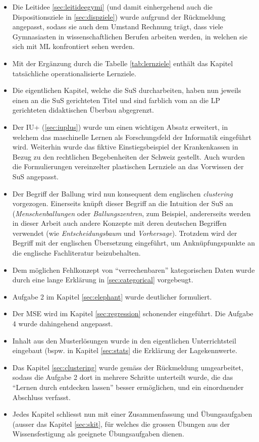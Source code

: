 \documentclass[twocolumn]{article}
\begin{document}
\begin{itemize}
    \item Die Leitidee \ref{sec:leitideegymi} (und damit einhergehend auch die Dispositionsziele in \ref{sec:dispziele}) wurde aufgrund der Rückmeldung angepasst, sodass sie auch dem Umstand Rechnung trägt, dass viele Gymnasiasten in wissenschaftlichen Berufen arbeiten werden, in welchen sie sich mit ML konfrontiert sehen werden.
    \item Mit der Ergänzung durch die Tabelle \ref{tab:lernziele} enthält das Kapitel tatsächliche operationalisierte Lernziele. 
    \item Die eigentlichen Kapitel, welche die SuS durcharbeiten, haben nun jeweils einen an die SuS gerichteten Titel und sind farblich vom an die LP gerichteten didaktischen Überbau abgegrenzt.
    \item Der IU+ (\ref{sec:iuplus}) wurde um einen wichtigen Absatz erweitert, in welchem das maschinelle Lernen als Forschungsfeld der Informatik eingeführt wird. Weiterhin wurde das fiktive Einstiegsbeispiel der Krankenkassen in Bezug zu den rechtlichen Begebenheiten der Schweiz gestellt. Auch wurden die Formulierungen vereinzelter plastischen Lernziele an das Vorwissen der SuS angepasst.
    \item Der Begriff der Ballung wird nun konsequent dem englischen \textit{clustering} vorgezogen. Einerseits knüpft dieser Begriff an die Intuition der SuS an (\textit{Menschenballungen} oder \textit{Ballungszentren}, zum Beispiel, andererseits werden in dieser Arbeit auch andere Konzepte mit deren deutschen Begriffen verwendet (wie \textit{Entscheidungsbaum} und \textit{Vorhersage}). Trotzdem wird der Begriff mit der englischen Übersetzung eingeführt, um Anknüpfungspunkte an die englische Fachliteratur beizubehalten.
   \item Dem möglichen Fehlkonzept von ``verrechenbaren'' kategorischen Daten wurde durch eine lange Erklärung in \ref{sec:categorical} vorgebeugt.
   \item Aufgabe 2 im Kapitel \ref{sec:elephant} wurde deutlicher formuliert.
   \item Der MSE wird im Kapitel \ref{sec:regression} schonender eingeführt. Die Aufgabe 4 wurde dahingehend angepasst.
   \item Inhalt aus den Musterlösungen wurde in den eigentlichen Unterrichtsteil eingebaut (bspw. in Kapitel \ref{sec:stats} die Erklärung der Lagekennwerte.
   \item Das Kapitel \ref{sec:clustering} wurde gemäss der Rückmeldung umgearbeitet, sodass die Aufgabe 2 dort in mehrere Schritte unterteilt wurde, die das ``Lernen durch entdecken lassen'' besser ermöglichen, und ein einordnender Abschluss verfasst.
   \item Jedes Kapitel schliesst nun mit einer Zusammenfassung und Übungsaufgaben (ausser das Kapitel \ref{sec:skit}, für welches die grossen Übungen aus der Wissensfestigung als geeignete Übungsaufgaben dienen.
\end{itemize}
\end{document}
